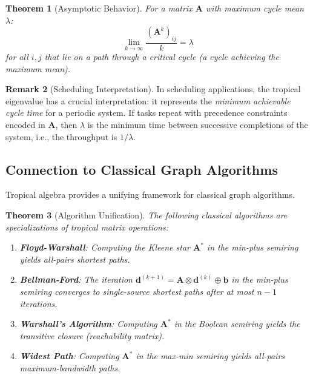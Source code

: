 \documentclass[11pt,a4paper]{article}
\theoremstyle{plain}
\newtheorem{theorem}{Theorem}[section]
\theoremstyle{definition}
\newtheorem{remark}[theorem]{Remark}
\newcommand{\mat}[1]{\mathbf{#1}}
\newcommand{\vect}[1]{\mathbf{#1}}
\begin{document}
\begin{theorem}[Asymptotic Behavior]
\label{thm:asymptotic}
For a matrix $\mat{A}$ with maximum cycle mean $\lambda$:
\begin{equation}
    \lim_{k \to \infty} \frac{(\mat{A}^k)_{ij}}{k} = \lambda
\end{equation}
for all $i, j$ that lie on a path through a critical cycle (a cycle achieving the maximum mean).
\end{theorem}

\begin{remark}[Scheduling Interpretation]
In scheduling applications, the tropical eigenvalue has a crucial interpretation: it represents the \emph{minimum achievable cycle time} for a periodic system. If tasks repeat with precedence constraints encoded in $\mat{A}$, then $\lambda$ is the minimum time between successive completions of the system, i.e., the throughput is $1/\lambda$.
\end{remark}

\subsection{Connection to Classical Graph Algorithms}
\label{subsec:graph-algorithms}

Tropical algebra provides a unifying framework for classical graph algorithms.

\begin{theorem}[Algorithm Unification]
\label{thm:unification}
The following classical algorithms are specializations of tropical matrix operations:
\begin{enumerate}[label=(\roman*)]
    \item \textbf{Floyd-Warshall}: Computing the Kleene star $\mat{A}^*$ in the min-plus semiring yields all-pairs shortest paths.
    
    \item \textbf{Bellman-Ford}: The iteration $\vect{d}^{(k+1)} = \mat{A} \otimes \vect{d}^{(k)} \oplus \vect{b}$ in the min-plus semiring converges to single-source shortest paths after at most $n-1$ iterations.
    
    \item \textbf{Warshall's Algorithm}: Computing $\mat{A}^*$ in the Boolean semiring yields the transitive closure (reachability matrix).
    
    \item \textbf{Widest Path}: Computing $\mat{A}^*$ in the max-min semiring yields all-pairs maximum-bandwidth paths.
\end{enumerate}
\end{theorem}
\end{document}
